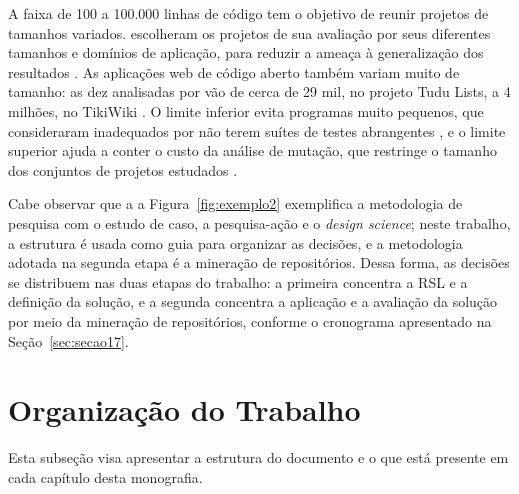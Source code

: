 A faixa de 100 a 100.000 linhas de código tem o objetivo de reunir projetos de tamanhos variados.  escolheram os projetos de sua avaliação por seus diferentes tamanhos e domínios de aplicação, para reduzir a ameaça à generalização dos resultados \cite{ashong2025}. As aplicações web de código aberto também variam muito de tamanho: as dez analisadas por  vão de cerca de 29 mil, no projeto Tudu Lists, a 4 milhões, no TikiWiki \cite{yandrapally2021}. O limite inferior evita programas muito pequenos, que  consideraram inadequados por não terem suítes de testes abrangentes \cite{just2014}, e o limite superior ajuda a conter o custo da análise de mutação, que restringe o tamanho dos conjuntos de projetos estudados \cite{ashong2025}.


Cabe observar que a a Figura~\ref{fig:exemplo2} exemplifica a metodologia de pesquisa com o estudo de caso, a pesquisa-ação e o \textit{design science}; neste trabalho, a estrutura é usada como guia para organizar as decisões, e a metodologia adotada na segunda etapa é a mineração de repositórios. Dessa forma, as decisões se distribuem nas duas etapas do trabalho: a primeira concentra a RSL e a definição da solução, e a segunda concentra a aplicação e a avaliação da solução por meio da mineração de repositórios, conforme o cronograma apresentado na  Seção~\ref{sec:secao17}.



\section{Organização do Trabalho}
\label{sec:organizacao-trabalho}

Esta subseção visa apresentar a estrutura do documento e o que está presente em cada capítulo desta monografia.

